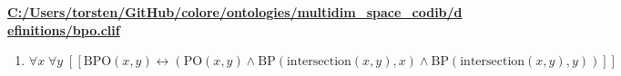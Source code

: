 \documentclass{article}
\begin{document}
\textbf{\url{C:/Users/torsten/GitHub/colore/ontologies/multidim\_space\_codib/definitions/bpo.clif}}

\begin{enumerate}
\item $\forall x\; \forall y\;  \left[ \left[ \textrm{BPO}(x,y) \leftrightarrow \left(\textrm{PO}(x,y) \land \textrm{BP}(\textrm{intersection}(x,y),x) \land \textrm{BP}(\textrm{intersection}(x,y),y)\right) \right] \right]$
\end{enumerate}
\end{document}
